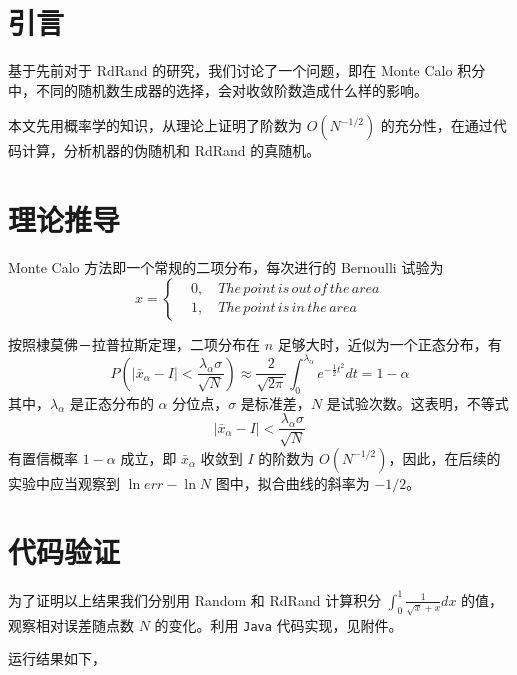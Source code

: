 \documentclass[12pt,a4paper]{article}%
\begin{document}
    \section{引言}
    基于先前对于 RdRand 的研究，我们讨论了一个问题，即在 Monte Calo 积分中，不同的随机数生成器的选择，会对收敛阶数造成什么样的影响。

    本文先用概率学的知识，从理论上证明了阶数为 \(O(N^{-1/2})\) 的充分性，在通过代码计算，分析机器的伪随机和 RdRand 的真随机。


    \section{理论推导}
    Monte Calo 方法即一个常规的二项分布，每次进行的 Bernoulli 试验为
    \begin{equation*}
        x =\left\{
        \begin{aligned}
            & 0, \quad The\, point\, is\, out\, of\, the\, area\\
            & 1, \quad The\, point\, is\, in\, the\, area
        \end{aligned}
        \right.
    \end{equation*}

    按照棣莫佛－拉普拉斯定理，二项分布在 \(n\) 足够大时，近似为一个正态分布，有
    \begin{equation*}
        P(\left| \bar{x}_\alpha - I \right| < \frac{\lambda_\alpha \sigma}{\sqrt {N}}) \approx \frac{2}{\sqrt{2 \pi}} \int^{\lambda_\alpha}_0 e^{-\frac{1}{2} t^2} dt = 1 - \alpha
    \end{equation*}
    其中，\(\lambda_\alpha\) 是正态分布的 \(\alpha\) 分位点，\(\sigma\) 是标准差，\(N\) 是试验次数。这表明，不等式
    \begin{equation*}
        \left| \bar{x}_\alpha - I \right| < \frac{\lambda_\alpha \sigma}{\sqrt {N}}
    \end{equation*}
    有置信概率 \(1 - \alpha\) 成立，即 \(\bar{x}_\alpha\) 收敛到 \(I\) 的阶数为 \(O (N^{-1 / 2})\)，因此，在后续的实验中应当观察到 \(\ln err - \ln N\) 图中，拟合曲线的斜率为 \(- 1 / 2\)。


    \section{代码验证}
    为了证明以上结果我们分别用 Random 和 RdRand 计算积分 \(\int^1_0 \frac{1}{\sqrt {x} + x} dx\) 的值，观察相对误差随点数 \(N\) 的变化。利用 \texttt{Java} 代码实现，见附件。

    运行结果如下，
\end{document}
